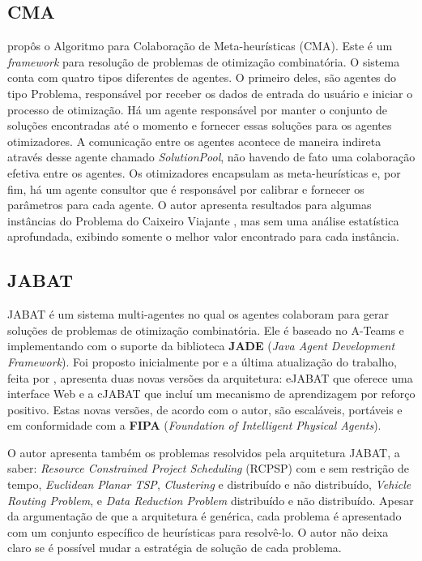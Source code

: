 \subsection{CMA}
 propôs o Algoritmo para Colaboração de Meta-heurísticas (CMA). Este é um \textit{framework} para resolução de problemas de otimização combinatória. O sistema conta com quatro tipos diferentes de agentes. O primeiro deles, são agentes do tipo Problema, responsável por receber os dados de entrada do usuário e iniciar o processo de otimização. Há um agente responsável por manter o conjunto de soluções encontradas até o momento e fornecer essas soluções para os agentes otimizadores. A comunicação entre os agentes acontece de maneira indireta através desse agente chamado \textit{SolutionPool}, não havendo de fato uma colaboração efetiva entre os agentes. Os otimizadores encapsulam as meta-heurísticas e, por fim, há um agente consultor que é responsável por calibrar e fornecer os parâmetros para cada agente. O autor apresenta resultados para algumas instâncias do Problema do Caixeiro Viajante \cite{malek2010}, mas sem uma análise estatística aprofundada, exibindo somente o melhor valor encontrado para cada instância. 

\subsection{JABAT}
JABAT é um sistema multi-agentes no qual os agentes colaboram para gerar soluções de problemas de otimização combinatória. Ele é baseado no A-Teams e implementando com o suporte da biblioteca \textbf{JADE} (\textit{Java Agent Development Framework}). Foi proposto inicialmente por  e a última atualização do trabalho, feita por , apresenta duas novas versões da arquitetura: eJABAT que oferece uma interface Web e a cJABAT que incluí um mecanismo de aprendizagem por reforço positivo. Estas novas versões, de acordo com o autor, são escaláveis, portáveis e em conformidade com a \textbf{FIPA} (\textit{Foundation of Intelligent Physical Agents}). 

O autor apresenta também os problemas resolvidos pela arquitetura JABAT, a saber: \textit{Resource Constrained Project Scheduling} (RCPSP) com e sem restrição de tempo, \textit{Euclidean Planar TSP}, \textit{Clustering} e distribuído e não distribuído, \textit{Vehicle Routing Problem}, e \textit{Data Reduction Problem} distribuído e não distribuído. Apesar da argumentação de que a arquitetura é genérica, cada problema é apresentado com um conjunto específico de heurísticas para resolvê-lo. O autor não deixa claro se é possível mudar a estratégia de solução de cada problema. 

